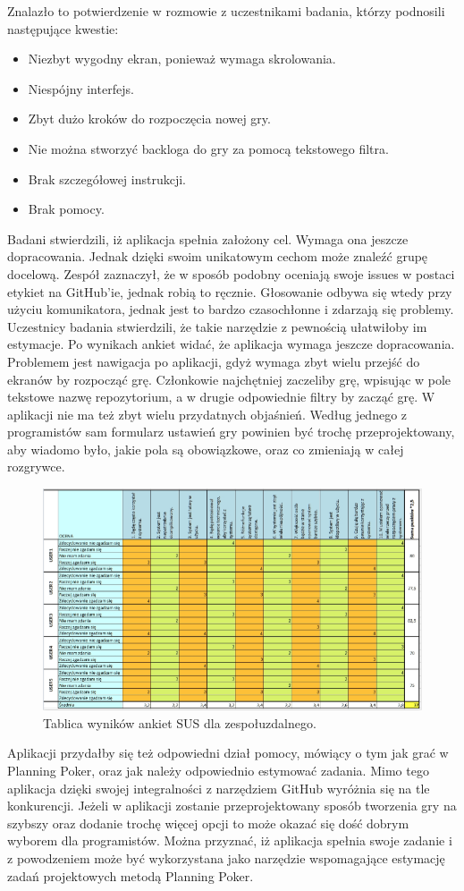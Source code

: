 Znalazło to potwierdzenie w rozmowie z uczestnikami badania, którzy podnosili następujące kwestie:
\begin{itemize}
	\item Niezbyt wygodny ekran, ponieważ wymaga skrolowania.
	\item Niespójny interfejs.
	\item Zbyt dużo kroków do rozpoczęcia nowej gry.
	\item Nie można stworzyć backloga do gry za pomocą tekstowego filtra.
	\item Brak szczegółowej instrukcji.
	\item Brak pomocy.
\end{itemize}
Badani stwierdzili, iż aplikacja spełnia założony cel. Wymaga ona jeszcze dopracowania. Jednak dzięki
swoim unikatowym cechom może znaleźć grupę docelową.
Zespół zaznaczył, że w sposób podobny oceniają swoje issues w postaci etykiet na GitHub’ie, jednak
robią to ręcznie. Głosowanie odbywa się wtedy przy użyciu komunikatora, jednak jest to bardzo czasochłonne i
zdarzają się problemy. Uczestnicy badania stwierdzili, że takie narzędzie z pewnością ułatwiłoby im estymacje.
Po wynikach ankiet widać, że aplikacja wymaga jeszcze dopracowania. Problemem jest nawigacja po
aplikacji, gdyż wymaga zbyt wielu przejść do ekranów by rozpocząć grę. Członkowie najchętniej zaczeliby grę,
wpisując w pole tekstowe nazwę repozytorium, a w drugie odpowiednie filtry by zacząć grę. W aplikacji nie ma
też zbyt wielu przydatnych objaśnień. Według jednego z programistów sam formularz ustawień gry powinien
być trochę przeprojektowany, aby wiadomo było, jakie pola są obowiązkowe, oraz co zmieniają w całej
rozgrywce.
\begin{figure}[H]
	\centering\includegraphics[width=\textwidth]{img/Badanie2.png}
	\caption{Tablica wyników ankiet SUS dla zespołuzdalnego.}\label{rys:badanie2}%
\end{figure}
Aplikacji przydałby się też odpowiedni dział pomocy, mówiący o tym jak grać w Planning Poker, oraz jak
należy odpowiednio estymować zadania. Mimo tego aplikacja dzięki swojej integralności z narzędziem GitHub
wyróżnia się na tle konkurencji. Jeżeli w aplikacji zostanie przeprojektowany sposób tworzenia gry na szybszy
oraz dodanie trochę więcej opcji to może okazać się dość dobrym wyborem dla programistów.
Można przyznać, iż aplikacja spełnia swoje zadanie i z powodzeniem może być wykorzystana jako
narzędzie wspomagające estymację zadań projektowych metodą Planning Poker.